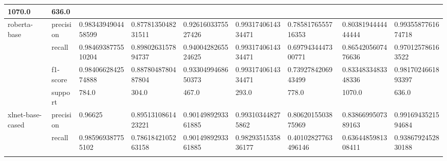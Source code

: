 \begin{landscape}
\begin{table}[]
{\begin{tabular}{@{}lllllllll@{}}
  \multicolumn{1}{l|}{1070.0} &
  \multicolumn{1}{l|}{636.0} \\ \midrule
\multicolumn{1}{|l|}{\multirow{4}{*}{roberta-base}} &
  \multicolumn{1}{l|}{precision} &
  \multicolumn{1}{l|}{0.9834394904458599} &
  \multicolumn{1}{l|}{0.8778135048231511} &
  \multicolumn{1}{l|}{0.9261603375527426} &
  \multicolumn{1}{l|}{0.9931740614334471} &
  \multicolumn{1}{l|}{0.7858176555716353} &
  \multicolumn{1}{l|}{0.8038194444444444} &
  \multicolumn{1}{l|}{0.9935587761674718} \\ \cmidrule(l){2-9} 
\multicolumn{1}{|l|}{} &
  \multicolumn{1}{l|}{recall} &
  \multicolumn{1}{l|}{0.9846938775510204} &
  \multicolumn{1}{l|}{0.8980263157894737} &
  \multicolumn{1}{l|}{0.9400428265524625} &
  \multicolumn{1}{l|}{0.9931740614334471} &
  \multicolumn{1}{l|}{0.6979434447300771} &
  \multicolumn{1}{l|}{0.8654205607476636} &
  \multicolumn{1}{l|}{0.970125786163522} \\ \cmidrule(l){2-9} 
\multicolumn{1}{|l|}{} &
  \multicolumn{1}{l|}{f1-score} &
  \multicolumn{1}{l|}{0.9840662842574888} &
  \multicolumn{1}{l|}{0.8878048780487804} &
  \multicolumn{1}{l|}{0.9330499468650373} &
  \multicolumn{1}{l|}{0.9931740614334471} &
  \multicolumn{1}{l|}{0.7392784206943499} &
  \multicolumn{1}{l|}{0.8334833483348336} &
  \multicolumn{1}{l|}{0.9817024661893397} \\ \cmidrule(l){2-9} 
\multicolumn{1}{|l|}{} &
  \multicolumn{1}{l|}{support} &
  \multicolumn{1}{l|}{784.0} &
  \multicolumn{1}{l|}{304.0} &
  \multicolumn{1}{l|}{467.0} &
  \multicolumn{1}{l|}{293.0} &
  \multicolumn{1}{l|}{778.0} &
  \multicolumn{1}{l|}{1070.0} &
  \multicolumn{1}{l|}{636.0} \\ \midrule
\multicolumn{1}{|l|}{\multirow{4}{*}{xlnet-base-cased}} &
  \multicolumn{1}{l|}{precision} &
  \multicolumn{1}{l|}{0.96625} &
  \multicolumn{1}{l|}{0.8951310861423221} &
  \multicolumn{1}{l|}{0.9014989293361885} &
  \multicolumn{1}{l|}{0.993103448275862} &
  \multicolumn{1}{l|}{0.8062015503875969} &
  \multicolumn{1}{l|}{0.8386699507389163} &
  \multicolumn{1}{l|}{0.9916943521594684} \\ \cmidrule(l){2-9} 
\multicolumn{1}{|l|}{} &
  \multicolumn{1}{l|}{recall} &
  \multicolumn{1}{l|}{0.985969387755102} &
  \multicolumn{1}{l|}{0.7861842105263158} &
  \multicolumn{1}{l|}{0.9014989293361885} &
  \multicolumn{1}{l|}{0.9829351535836177} &
  \multicolumn{1}{l|}{0.40102827763496146} &
  \multicolumn{1}{l|}{0.6364485981308411} &
  \multicolumn{1}{l|}{0.9386792452830188} \\ \cmidrule(l){2-9} 

\end{tabular}}
\end{table}
\end{landscape}
